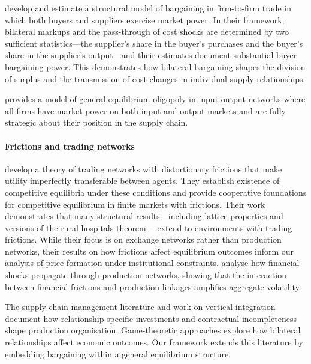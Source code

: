 \documentclass[11pt,fleqn]{article}
\begin{document}
\citet{Alviarez2026} develop and estimate a structural model of bargaining in firm-to-firm trade in which both buyers and suppliers exercise market power. In their framework, bilateral markups and the pass-through of cost shocks are determined by two sufficient statistics---the supplier's share in the buyer's purchases and the buyer's share in the supplier's output---and their estimates document substantial buyer bargaining power. This demonstrates how bilateral bargaining shapes the division of surplus and the transmission of cost changes in individual supply relationships. 

\citet{Bizzarri2023} provides a model of general equilibrium oligopoly in input-output networks where all firms have market power on both input and output markets and are fully strategic about their position in the supply chain.

\paragraph{Frictions and trading networks}

\citet{Fleiner2019,Fleiner2022} develop a theory of trading networks with distortionary frictions that make utility imperfectly transferable between agents. They establish existence of competitive equilibria under these conditions and provide cooperative foundations for competitive equilibrium in finite markets with frictions. Their work demonstrates that many structural results---including lattice properties and versions of the rural hospitals theorem \citep{RothSotomayor1990}---extend to environments with trading frictions. While their focus is on exchange networks rather than production networks, their results on how frictions affect equilibrium outcomes inform our analysis of price formation under institutional constraints. \citet{Huremovic2020} analyse how financial shocks propagate through production networks, showing that the interaction between financial frictions and production linkages amplifies aggregate volatility.

The supply chain management literature \citep{Cachon2003} and work on vertical integration \citep{Williamson1985} document how relationship-specific investments and contractual incompleteness shape production organisation. Game-theoretic approaches \citep{KrantonMinehart2001} explore how bilateral relationships affect economic outcomes. Our framework extends this literature by embedding bargaining within a general equilibrium structure.
\end{document}
